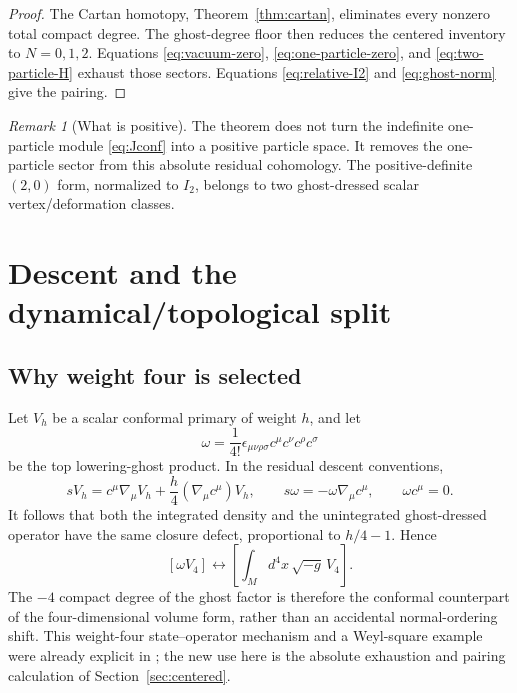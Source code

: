 \documentclass[11pt]{article}
\theoremstyle{definition}
\theoremstyle{remark}
\newtheorem{remark}[theorem]{Remark}
\begin{document}
\begin{proof}
The Cartan homotopy, Theorem~\ref{thm:cartan}, eliminates every nonzero
total compact degree.  The ghost-degree floor then reduces the centered
inventory to $N=0,1,2$.  Equations \eqref{eq:vacuum-zero},
\eqref{eq:one-particle-zero}, and \eqref{eq:two-particle-H} exhaust those
sectors.  Equations \eqref{eq:relative-I2} and \eqref{eq:ghost-norm} give the
pairing.
\end{proof}

\begin{remark}[What is positive]
The theorem does not turn the indefinite one-particle module
\eqref{eq:Jconf} into a positive particle space.  It removes the
one-particle sector from this absolute residual cohomology.  The
positive-definite $(2,0)$ form, normalized to $I_2$, belongs to two ghost-dressed
scalar vertex/deformation classes.
\end{remark}

\section{Descent and the dynamical/topological split}\label{sec:descent}

\subsection{Why weight four is selected}

Let $V_h$ be a scalar conformal primary of weight $h$, and let
\begin{equation}\label{eq:ghost-volume}
 \omega=\frac1{4!}\epsilon_{\mu\nu\rho\sigma}
 c^\mu c^\nu c^\rho c^\sigma
\end{equation}
be the top lowering-ghost product.  In the residual descent conventions,
\begin{equation}\label{eq:descent-transformations}
 sV_h=c^\mu\nabla_\mu V_h
 +\frac h4(\nabla_\mu c^\mu)V_h,
 \qquad
 s\omega=-\omega\nabla_\mu c^\mu,
 \qquad \omega c^\mu=0.
\end{equation}
It follows that both the integrated density and the unintegrated
ghost-dressed operator have the same closure defect,
proportional to $h/4-1$.  Hence
\begin{equation}\label{eq:descent-map}
 \boxed{[\omega V_4]\longleftrightarrow
 \left[\int_M d^4x\,\sqrt{-g}\,V_4\right].}
\end{equation}
The $-4$ compact degree of the ghost factor is therefore the conformal
counterpart of the four-dimensional volume form, rather than an accidental
normal-ordering shift.  This weight-four state--operator mechanism and a
Weyl-square example were already explicit in \cite{HamadaBRST}; the new use
here is the absolute exhaustion and pairing calculation of
Section~\ref{sec:centered}.
\end{document}
